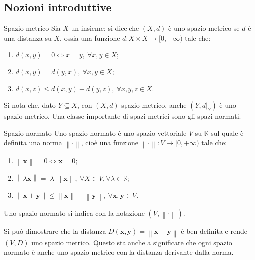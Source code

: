 \documentclass[11pt, a4paper]{scrartcl}
\theoremstyle{definition}
\numberwithin{esempio}{section}
\theoremstyle{definition}
\numberwithin{obs}{section}
\numberwithin{nota}{section}
\numberwithin{equation}{subsection}
\begin{document}
\subsection{Nozioni introduttive}
\begin{definizione}
	{Spazio metrico}{}
	Sia $X$ un insieme; si dice che $(X,d)$ \`e uno spazio metrico se $d$ \`e una distanza su $X$, ossia una funzione $d:X \times X\to [0,+\infty)$ tale che:
	\begin{enumerate}[(d1).]
		\item $d(x,y) = 0 \iff x= y, \ \forall  x,y \in X$;
		\item $d(x,y) = d(y,x), \ \forall x,y \in X$;
		\item $d(x,z) \le d(x,y) + d(y,z) , \ \forall x,y,z \in X$.
	\end{enumerate}
\end{definizione}
\noindent Si nota che, dato $Y \subseteq X$, con $(X,d)$ spazio metrico, anche $(Y,d | _Y)$ \`e uno spazio metrico.
Una classe importante di spazi metrici sono gli spazi normati.
\begin{definizione}
	{Spazio normato}{}
	Uno spazio normato \`e uno spazio vettoriale $V$ su $\mathbb{K}$ sul quale \`e definita una norma $\left\lVert \cdot  \right\rVert $, cio\`e una funzione $\left\lVert \cdot  \right\rVert : V \to [0, + \infty)$ tale che:
	\begin{enumerate}[(n1).]
		\item $\left\lVert \mathbf{x}  \right\rVert = 0 \iff \mathbf{x} = 0 $;
		\item $\left\lVert \lambda \mathbf{x}  \right\rVert = \lvert \lambda  \rvert \left\lVert \mathbf{x}  \right\rVert , \ \forall X \in V , \forall \lambda  \in \mathbb{K}$;
		\item $\left\lVert \mathbf{x} +\mathbf{y}  \right\rVert \le \left\lVert \mathbf{x}  \right\rVert + \left\lVert \mathbf{y}  \right\rVert , \ \forall \mathbf{x} ,\mathbf{y} \in V$.
	\end{enumerate}
	Uno spazio normato si indica con la notazione $(V,\left\lVert \cdot  \right\rVert )$.
\end{definizione}
\noindent Si pu\`o dimostrare che la distanza $D(\mathbf{x} ,\mathbf{y} ) = \left\lVert \mathbf{x} - \mathbf{y}  \right\rVert $ \`e ben definita e rende $(V, D)$ uno spazio metrico.
Questo sta anche a significare che ogni spazio normato \`e anche uno spazio metrico con la distanza derivante dalla norma.
\end{document}
